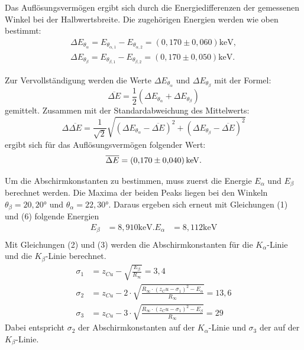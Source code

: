 \noindent Das Auflösungsvermögen ergibt sich durch die Energiedifferenzen der gemessenen Winkel bei der Halbwertsbreite. Die zugehörigen Energien werden wie oben bestimmt:
\begin{align*}
\Delta E_{\theta_{\alpha}} = E_{\theta_{\alpha,1}} - E_{\theta_{\alpha,2}} = (0,170 \pm 0,060) \si{\keV}, \\
\Delta E_{\theta_{\beta}} = E_{\theta_{\beta,1}} - E_{\theta_{\beta,2}} = (0,170 \pm 0,050) \si{\keV}. 
\end{align*}

\noindent Zur Vervollständigung werden die Werte $\Delta E_{\theta_{\alpha}}$ und $\Delta E_{\theta_{\beta}}$ mit der Formel:
\begin{equation}
  \label{eqn:mittelenergie}
  \overline{\Delta E} = \frac{1}{2}(\Delta E_{\theta_{\alpha}} + \Delta E_{\theta_{\beta}})
\end{equation}
gemittelt. Zusammen mit der Standardabweichung des Mittelwerts:
\begin{equation}
  \label{eqn:abweichung}
  \Delta \overline{\Delta E} = \frac{1}{\sqrt{2}}\sqrt{(\Delta E_{\theta_{\alpha}} - \overline{\Delta E})^2 + (\Delta E_{\theta_{\beta}} - \overline{\Delta E})^2}
\end{equation}
ergibt sich für das Auflösungsvermögen folgender Wert:
\begin{align*}
\overline{\Delta E} = (\num{0.170 +- 0.040})\,\si{\kilo\electronvolt}.
\end{align*}


\noindent Um die Abschirmkonstanten zu bestimmen, muss zuerst die Energie $E_\alpha$ und $E_\beta$ berechnet werden. 
Die Maxima der beiden Peaks liegen bei den Winkeln $\theta_{\beta} = 20,20$° und $\theta_{\alpha} = 22,30$°.
Daraus ergeben sich erneut mit Gleichungen (1) und (6) folgende Energien
\begin{align*}
E_\beta &= 8,910 \si{\keV}.
E_\alpha &= 8,112 \si{\keV} \\
\end{align*}
Mit Gleichungen (2) und (3) werden die Abschirmkonstanten für die $K_{\alpha}$-Linie und die $K_{\beta}$-Linie berechnet.
\begin{align*}
\sigma_1 &= z_{Cu} - \sqrt{\frac{E_\beta}{R_\infty}} = 3,4\\
\sigma_2 &= z_{Cu} - 2 \cdot \sqrt{\frac{R_\infty \cdot (z_Cu - \sigma_1)^2 - E_\alpha}{R_\infty}} = 13,6 \\
\sigma_3 &= z_{Cu} - 3 \cdot \sqrt{\frac{R_\infty \cdot (z_Cu - \sigma_1)^2 - E_\beta}{R_\infty}} = 29
\end{align*}
Dabei entspricht $\sigma_2$ der Abschirmkonstanten auf der $K_{\alpha}$-Linie und $\sigma_3$ der auf der $K_{\beta}$-Linie.


